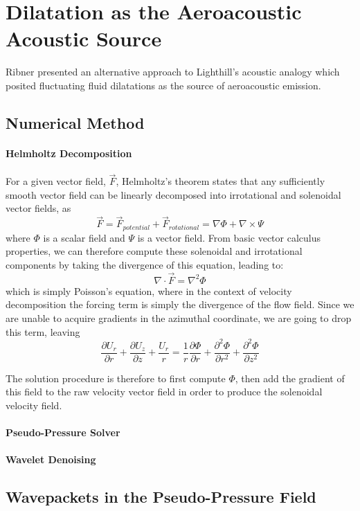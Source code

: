 \chapter{Dilatation as the Aeroacoustic Acoustic Source}
Ribner presented an alternative approach to Lighthill's acoustic analogy which posited fluctuating fluid dilatations as the source of aeroacoustic emission.
\section{Numerical Method}
\subsubsection{Helmholtz Decomposition}
	For a given vector field, $\vec{F}$, Helmholtz's theorem states that any sufficiently smooth vector field can be linearly decomposed into irrotational and solenoidal vector fields, as
	\begin{equation}
	\vec{F} = \vec{F}_{potential} + \vec{F}_{rotational} = \nabla \Phi + \nabla \times \Psi
	\end{equation}
	where $\Phi$ is a scalar field and $\Psi$ is a vector field.
	From basic vector calculus properties, we can therefore compute these solenoidal and irrotational components by taking the divergence of this equation, leading to:
	\begin{equation}
	\nabla \cdot \vec{F} = \nabla^{2} \Phi
	\end{equation}
	which is simply Poisson's equation, where in the context of velocity decomposition the forcing term is simply the divergence of the flow field.
	Since we are unable to acquire gradients in the azimuthal coordinate, we are going to drop this term, leaving
	\begin{equation}
	\frac{\partial U_r}{\partial r} + \frac{\partial U_z}{\partial z} + \frac{U_r}{r} = \frac{1}{r} \frac{\partial \Phi}{\partial r} + \frac{\partial^2 \Phi}{\partial r^2} + \frac{\partial^2 \Phi}{\partial z^2} 
	\end{equation}
	
	The solution procedure is therefore to first compute $\Phi$, then add the gradient of this field to the raw velocity vector field in order to produce the solenoidal velocity field.
\subsubsection{Pseudo-Pressure Solver}
\subsubsection{Wavelet Denoising}
\section{Wavepackets in the Pseudo-Pressure Field}